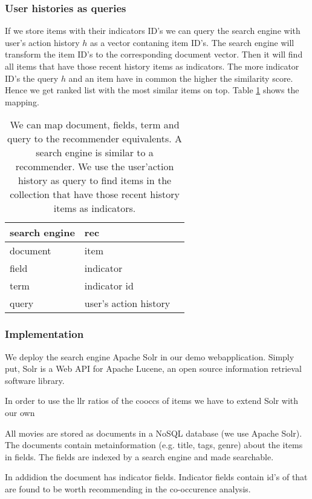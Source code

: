 \subsubsection{User histories as queries}
If we store items with their indicators ID's we can query the search engine with user's action history $h$ as a vector contaning item ID's. The search engine will transform the item ID's to the corresponding document vector. Then it will find all items that have those recent history items as indicators. The more indicator ID's the query $h$ and an item have in common the higher the similarity score. Hence we get ranked list with the most similar items on top. Table \ref{tbl:comparison} shows the mapping.

\begin{table}
\begin{center}
\begin{tabular}{lll}
 search engine & \gls{rec}\\ \hline
  document & item\\ 
 field & indicator \\
 term & indicator id    \\
 query & user's action history \\
\end{tabular}
\end{center}
\caption{We can map document, fields, term and query to the recommender equivalents. A search engine is similar to a recommender. We use the user'action history as query to find items in the collection that have those recent history items as indicators. }
\label{tbl:comparison}
\end{table}

\subsubsection{Implementation}
\label{sec:solrimpl}
We deploy the search engine Apache Solr in our demo webapplication. Simply put, Solr is a Web API for Apache Lucene, an open source information retrieval software library. 

In order to use the \gls{llr} ratios of the \glspl{coocc} of items we have to extend Solr with our own 

All movies are stored as documents in a NoSQL database (we use Apache Solr). The documents contain metainformation (e.g. title, tags, genre) about the items in fields. The fields are indexed by a search engine and made searchable.

In addidion the document has indicator fields. Indicator fields contain id's of that are found to be worth recommending in the co-occurence analysis.
